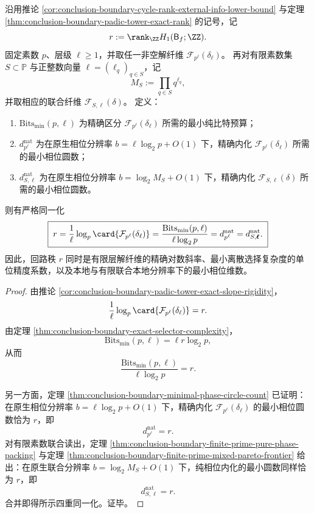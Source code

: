 \begin{theorem}[回路秩的四重同一化定理]\label{thm:conclusion-boundary-cycle-rank-fourfold-identification}
沿用推论 \ref{cor:conclusion-boundary-cycle-rank-external-info-lower-bound} 与定理 \ref{thm:conclusion-boundary-padic-tower-exact-rank} 的记号，记
\[
r:=\rank_{\ZZ}H_1(\mathsf B_f;\ZZ).
\]
固定素数 \(p\)、层级 \(\ell\ge 1\)，并取任一非空解纤维 \(\mathcal F_{p^\ell}(\delta_\ell)\)。
再对有限素数集 \(S\subset\mathbb P\) 与正整数向量 \(\boldsymbol\ell=(\ell_q)_{q\in S}\)，记
\[
M_S:=\prod_{q\in S}q^{\ell_q},
\]
并取相应的联合纤维 \(\mathcal F_{S,\boldsymbol\ell}(\delta)\)。
定义：
\begin{enumerate}
  \item \(\mathrm{Bits}_{\min}(p,\ell)\) 为精确区分 \(\mathcal F_{p^\ell}(\delta_\ell)\) 所需的最小纯比特预算；
  \item \(d^{\mathrm{nat}}_{p^\ell}\) 为在原生相位分辨率 \(b=\ell\log_2 p+O(1)\) 下，精确内化 \(\mathcal F_{p^\ell}(\delta_\ell)\) 所需的最小相位圆数；
  \item \(d^{\mathrm{nat}}_{S,\boldsymbol\ell}\) 为在原生相位分辨率 \(b=\log_2 M_S+O(1)\) 下，精确内化 \(\mathcal F_{S,\boldsymbol\ell}(\delta)\) 所需的最小相位圆数。
\end{enumerate}
则有严格同一化
\[
\boxed{\;
r
=
\frac{1}{\ell}\log_p\card{\mathcal F_{p^\ell}(\delta_\ell)}
=
\frac{\mathrm{Bits}_{\min}(p,\ell)}{\ell\log_2 p}
=
d^{\mathrm{nat}}_{p^\ell}
=
d^{\mathrm{nat}}_{S,\boldsymbol\ell}.
\;}
\]
因此，回路秩 \(r\) 同时是有限层解纤维的精确对数斜率、最小离散选择复杂度的单位精度系数，以及本地与有限联合本地分辨率下的最小相位维数。
\end{theorem}
\begin{proof}
由推论 \ref{cor:conclusion-boundary-padic-tower-exact-slope-rigidity}，
\[
\frac{1}{\ell}\log_p\card{\mathcal F_{p^\ell}(\delta_\ell)}=r.
\]
由定理 \ref{thm:conclusion-boundary-exact-selector-complexity}，
\[
\mathrm{Bits}_{\min}(p,\ell)=\ell r\log_2 p,
\]
从而
\[
\frac{\mathrm{Bits}_{\min}(p,\ell)}{\ell\log_2 p}=r.
\]

另一方面，定理 \ref{thm:conclusion-boundary-minimal-phase-circle-count} 已证明：在原生相位分辨率 \(b=\ell\log_2 p+O(1)\) 下，精确内化 \(\mathcal F_{p^\ell}(\delta_\ell)\) 的最小相位圆数恰为 \(r\)，即
\[
d^{\mathrm{nat}}_{p^\ell}=r.
\]
对有限素数联合读出，定理 \ref{thm:conclusion-boundary-finite-prime-pure-phase-packing} 与定理 \ref{thm:conclusion-boundary-finite-prime-mixed-pareto-frontier} 给出：在原生联合分辨率 \(b=\log_2 M_S+O(1)\) 下，纯相位内化的最小圆数同样恰为 \(r\)，即
\[
d^{\mathrm{nat}}_{S,\boldsymbol\ell}=r.
\]
合并即得所示四重同一化。证毕。
\end{proof}

